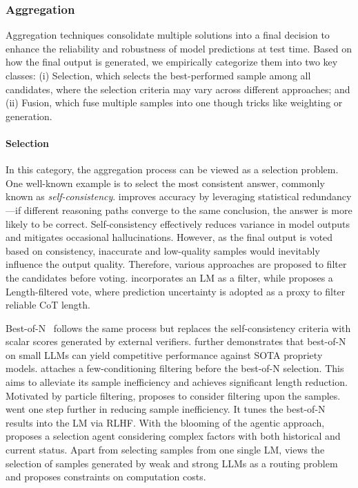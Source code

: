 
\subsubsection{Aggregation}
\label{subsec:aggregation}
Aggregation techniques consolidate multiple solutions into a final decision to enhance the reliability and robustness of model predictions at test time. 
Based on how the final output is generated, we empirically categorize them into two key classes: (i) Selection, which selects the best-performed sample among all candidates, where the selection criteria may vary across different approaches; and (ii) Fusion, which fuse multiple samples into one though tricks like weighting or generation.

\paragraph{Selection} 
In this category, the aggregation process can be viewed as a selection problem. 
One well-known example is to select the most consistent answer, commonly known as \textit{self-consistency}. \citet{wang2023selfconsistency} improves accuracy by leveraging statistical redundancy—if different reasoning paths converge to the same conclusion, the answer is more likely to be correct. Self-consistency effectively reduces variance in model outputs and mitigates occasional hallucinations. However, as the final output is voted based on consistency, inaccurate and low-quality samples would inevitably influence the output quality. Therefore, various approaches are proposed to filter the candidates before voting. \citet{chen2024are} incorporates an LM as a filter, while \citet{wu2025lessunderstandingchainofthoughtlength} proposes a Length-filtered vote, where prediction uncertainty is adopted as a proxy to filter reliable CoT length. 

Best-of-N~\citep{irvine2023rewarding} follows the same process but replaces the self-consistency criteria with scalar scores generated by external verifiers. 
\citet{song2024good} further demonstrates that best-of-N on small LLMs can yield competitive performance against SOTA propriety models.
\citet{munkhbat2025selftrainingelicitsconcisereasoning} attaches a few-conditioning filtering before the best-of-N selection. This aims to alleviate its sample inefficiency and achieves significant length reduction.
Motivated by particle filtering, \citet{puri2025probabilisticinferenceapproachinferencetime} proposes to consider filtering upon the samples.
\citet{sessa2024bondaligningllmsbestofn} went one step further in reducing sample inefficiency. It tunes the best-of-N results into the LM via RLHF.
With the blooming of the agentic approach, \citet{parmar2025plangenmultiagentframeworkgenerating} proposes a selection agent considering complex factors with both historical and current status.
Apart from selecting samples from one single LM, \citet{ong2025routellm} views the selection of samples generated by weak and strong LLMs as a routing problem and proposes constraints on computation costs. 

